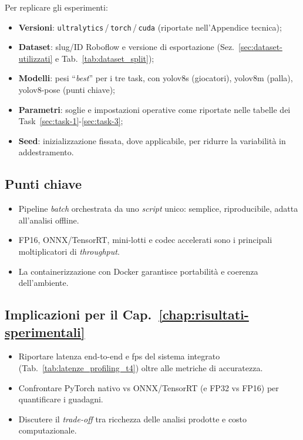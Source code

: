 \documentclass[12pt,a4paper,openright,twoside]{book}
\begin{document}
Per replicare gli esperimenti:
\begin{itemize}
  \item \textbf{Versioni}: \texttt{ultralytics}\,/\,\texttt{torch}\,/\,\texttt{cuda} (riportate nell'Appendice tecnica);
  \item \textbf{Dataset}: slug/ID Roboflow e versione di esportazione (Sez.~\ref{sec:dataset-utilizzati} e Tab.~\ref{tab:dataset_split});
  \item \textbf{Modelli}: pesi ``\emph{best}'' per i tre task, con \ac{yolo}v8s (giocatori), \ac{yolo}v8m (palla), \ac{yolo}v8-pose (punti chiave);
  \item \textbf{Parametri}: soglie e impostazioni operative come riportate nelle tabelle dei Task~\ref{sec:task-1}-\ref{sec:task-3};
  \item \textbf{Seed}: inizializzazione fissata, dove applicabile, per ridurre la variabilità in addestramento.
\end{itemize}

\subsection*{Punti chiave}
\begin{itemize}
  \item Pipeline \emph{batch} orchestrata da uno \emph{script} unico: semplice, riproducibile, adatta all'analisi offline.
  \item FP16, ONNX/TensorRT, mini-lotti e codec accelerati sono i principali moltiplicatori di \emph{throughput}.
  \item La containerizzazione con Docker garantisce portabilità e coerenza dell'ambiente.
\end{itemize}

\subsection*{Implicazioni per il Cap.~\ref{chap:risultati-sperimentali}}
\begin{itemize}
  \item Riportare latenza end-to-end e \ac{fps} del sistema integrato (Tab.~\ref{tab:latenze_profiling_t4}) oltre alle metriche di accuratezza.
  \item Confrontare PyTorch nativo vs ONNX/TensorRT (e FP32 vs FP16) per quantificare i guadagni.
  \item Discutere il \emph{trade-off} tra ricchezza delle analisi prodotte e costo computazionale.
\end{itemize}
\end{document}

